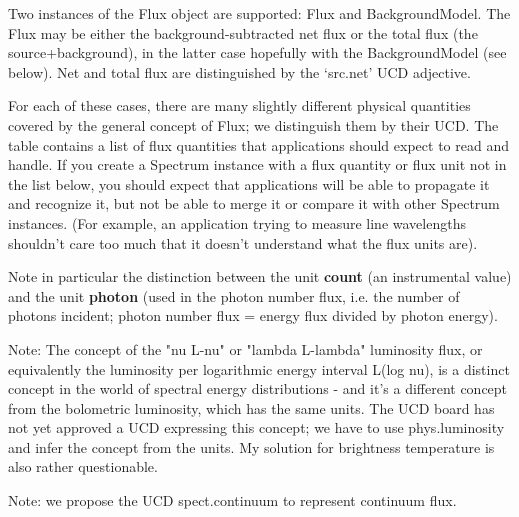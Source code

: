 \documentclass[11pt]{article}
\begin{document}
 
Two instances of the Flux object are supported:
Flux and BackgroundModel.
The Flux may be either the background-subtracted net flux
or the total flux
(the source+background), in the latter case hopefully with the BackgroundModel (see below).
Net and total flux are distinguished by the `src.net' UCD adjective.
 
For each of these cases, there are many slightly different physical quantities
covered by the general concept of Flux; we distinguish them
by their UCD. The table contains a list of flux quantities that applications
should expect to read and handle. If you create a Spectrum instance with
a flux quantity or flux unit not in the list below, you should expect that applications will be
able to propagate it and recognize it, but not be able to merge it or compare it
with other Spectrum instances. (For example, an application trying to measure
line wavelengths shouldn't care too much that it doesn't understand what the
flux units are).
  
Note in particular the distinction between the unit {\bf count }  (an
instrumental value) and the unit {\bf photon }  (used in the photon number flux, i.e.
the number of photons incident; photon number flux = energy flux divided by photon
energy).



Note: The concept of the "nu L-nu" or "lambda L-lambda" luminosity flux, or equivalently the luminosity per logarithmic
energy interval L(log nu), is a distinct concept in the world of spectral energy
distributions - and it's a different concept from the bolometric luminosity, which has the same units.
The UCD board has not yet approved a UCD expressing
this concept; we have to use phys.luminosity and infer the concept from the units.
My solution for brightness temperature is also rather questionable.


Note: we propose the UCD spect.continuum to represent continuum flux.
\end{document}
